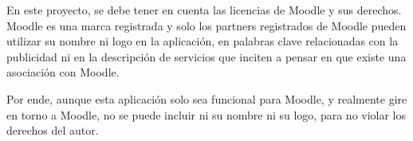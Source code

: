  En este proyecto, se debe tener en cuenta las licencias de Moodle y sus derechos. Moodle es una marca registrada y solo los partners registrados de Moodle pueden utilizar su nombre ni logo en la aplicación, en palabras clave relacionadas con la publicidad ni en la descripción de servicios que inciten a pensar en que existe una asociación con Moodle.

 Por ende, aunque esta aplicación solo sea funcional para Moodle, y realmente gire en torno a Moodle, no se puede incluir ni su nombre ni su logo, para no violar los derechos del autor.








